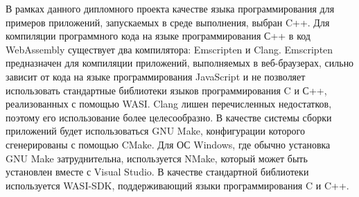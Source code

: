 В рамках данного дипломного проекта качестве языка программирования для примеров приложений, запускаемых в среде выполнения, выбран C++.
Для компиляции программного кода на языке программирования С++ в код WebAssembly существует два компилятора: Emscripten и Clang. 
Emscripten предназначен для компиляции приложений, выполняемых в веб-браузерах, сильно зависит от кода на языке программирования JavaScript и не позволяет использовать стандартные библиотеки языков программирования C и С++, реализованных с помощью WASI.
Clang лишен перечисленных недостатков, поэтому его использование более целесообразно.
В качестве системы сборки приложений будет использоваться GNU Make, конфигурации которого сгенерированы с помощью CMake.
Для ОС Windows, где обычно установка GNU Make затруднительна, используется NMake, который может быть установлен вместе с Visual Studio.
В качестве стандартной библиотеки используется WASI-SDK, поддерживающий языки программирования C и C++.
